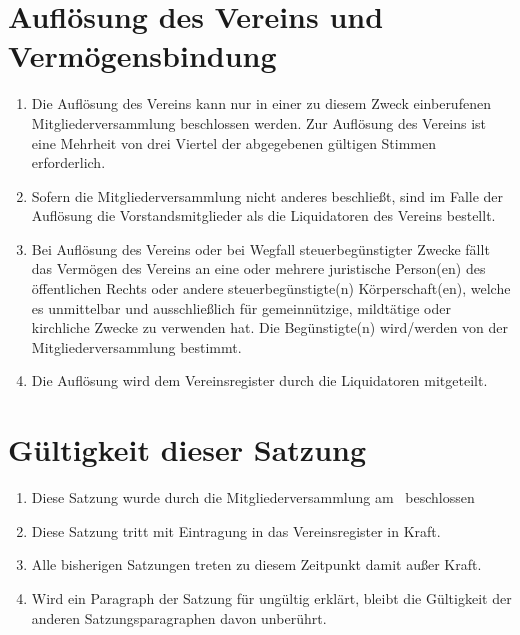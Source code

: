 \documentclass[a4paper,ngerman]{scrartcl}
\begin{document}

\section{Auflösung des Vereins und Vermögensbindung}
\begin{enumerate}
\item Die Auflösung des Vereins kann nur in einer zu diesem Zweck einberufenen Mitgliederversammlung beschlossen werden. Zur Auflösung des Vereins ist eine Mehrheit von drei Viertel der abgegebenen gültigen Stimmen erforderlich.
\item Sofern die Mitgliederversammlung nicht anderes beschließt, sind im Falle der Auflösung die Vorstandsmitglieder als die Liquidatoren des Vereins bestellt.
\item Bei Auflösung des Vereins oder bei Wegfall steuerbegünstigter Zwecke fällt das Vermögen des Vereins an eine oder mehrere juristische Person(en) des öffentlichen Rechts oder andere steuerbegünstigte(n) Körperschaft(en), welche es unmittelbar und ausschließlich für gemeinnützige, mildtätige oder kirchliche Zwecke zu verwenden hat. Die Begünstigte(n) wird/werden von der Mitgliederversammlung bestimmt.
\item Die Auflösung wird dem Vereinsregister durch die Liquidatoren mitgeteilt.
\end{enumerate}

\section{Gültigkeit dieser Satzung}
\begin{enumerate}
\item Diese Satzung wurde durch die Mitgliederversammlung am \MyDate~beschlossen
\item Diese Satzung tritt mit Eintragung in das Vereinsregister in Kraft.
\item Alle bisherigen Satzungen treten zu diesem Zeitpunkt damit außer Kraft.
\item Wird ein Paragraph der Satzung für ungültig erklärt, bleibt die Gültigkeit der anderen Satzungsparagraphen davon unberührt.
\end{enumerate}
\end{document}
